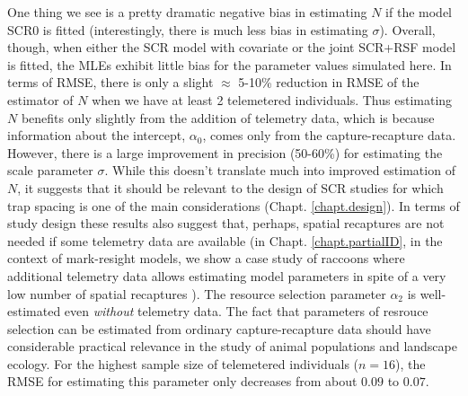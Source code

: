 One thing we see is a pretty dramatic negative
 bias in estimating $N$ if the
 model SCR0 is fitted (interestingly, there is much less bias in
estimating $\sigma$).  Overall, though, when either the SCR model with
covariate or the joint SCR+RSF model is fitted, the MLEs exhibit
little bias for the parameter values simulated here. In terms of RMSE,
there is only a slight $\approx$ 5-10\% reduction in RMSE of the
estimator of $N$ when we have at least 2 telemetered individuals.
Thus estimating $N$ benefits only slightly from the addition
of telemetry data, which is because information about the intercept,
$\alpha_{0}$, comes only from the capture-recapture data.  
However, there is a large improvement in precision (50-60\%) for 
estimating the scale parameter $\sigma$.  While this doesn't
translate much into improved estimation of $N$, it suggests that it
should be relevant to the design of SCR studies for which trap spacing
is one of the main considerations (Chapt. \ref{chapt.design}). In terms of study design these results also
suggest that, perhaps, spatial recaptures are not needed if some
telemetry data are available (in Chapt. \ref{chapt.partialID}, in the context of mark-resight models, we show a case study of raccoons where additional telemetry data allows estimating model parameters in spite of a very low number of spatial recaptures \citep{sollmann_etal:2012ecol}). The resource selection parameter
$\alpha_{2}$ is well-estimated even {\it without} telemetry data. The
fact that parameters of resrouce selection can be estimated from
ordinary capture-recapture data should have considerable practical
relevance in the study of animal populations and landscape
ecology. For the highest sample size of telemetered individuals
($n=16$), the RMSE for estimating this parameter only decreases from
about $0.09$ to $0.07$.



